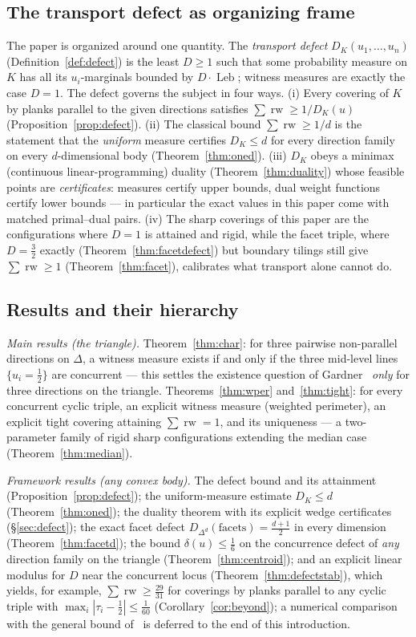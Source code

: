 \documentclass{aims}
\numberwithin{equation}{section}
\theoremstyle{plain}
\theoremstyle{definition}
\theoremstyle{remark}
\newcommand{\rw}{\operatorname{rw}}
\newcommand{\Leb}{\operatorname{Leb}}
\begin{document}
\subsection*{The transport defect as organizing frame}
The paper is organized around one quantity. The \emph{transport defect}
$D_K(u_1,\dots,u_n)$ (Definition~\ref{def:defect}) is the least $D\ge1$ such
that some probability measure on $K$ has all its $u_i$-marginals bounded by
$D\cdot\Leb$; witness measures are exactly the case $D=1$. The defect governs
the subject in four ways. (i) Every covering of $K$ by planks parallel to the
given directions satisfies $\sum\rw\ge1/D_K(u)$
(Proposition~\ref{prop:defect}). (ii) The classical bound $\sum\rw\ge1/d$ is
the statement that the \emph{uniform} measure certifies $D_K\le d$ for every
direction family on every $d$-dimensional body (Theorem~\ref{thm:oned}).
(iii) $D_K$ obeys a minimax (continuous linear-programming) duality
(Theorem~\ref{thm:duality}) whose feasible points are \emph{certificates}:
measures certify upper bounds, dual weight functions certify lower bounds ---
in particular the exact values in this paper come with matched primal--dual
pairs. (iv) The sharp coverings of this paper are the configurations where
$D=1$ is attained and rigid, while the facet triple, where
$D=\tfrac32$ exactly (Theorem~\ref{thm:facetdefect}) but boundary tilings
still give $\sum\rw\ge1$ (Theorem~\ref{thm:facet}), calibrates what transport
alone cannot do.

\subsection*{Results and their hierarchy}
\emph{Main results (the triangle).} Theorem~\ref{thm:char}: for three pairwise
non-parallel directions on $\Delta$, a witness measure exists if and only if
the three mid-level lines $\{u_i=\tfrac12\}$ are concurrent --- this settles
the existence question of Gardner~\cite{Gardner88} \emph{only} for three
directions on the triangle. Theorems~\ref{thm:wper} and~\ref{thm:tight}: for
every concurrent cyclic triple, an explicit witness measure (weighted
perimeter), an explicit tight covering attaining $\sum\rw=1$, and its
uniqueness --- a two-parameter family of rigid sharp configurations extending
the median case (Theorem~\ref{thm:median}).

\emph{Framework results (any convex body).} The defect bound and its
attainment (Proposition~\ref{prop:defect}); the uniform-measure estimate
$D_K\le d$ (Theorem~\ref{thm:oned}); the duality theorem with its explicit
wedge certificates (\S\ref{sec:defect}); the exact facet defect
$D_{\Delta^d}(\text{facets})=\tfrac{d+1}2$ in every dimension
(Theorem~\ref{thm:facetd}); the bound $\delta(u)\le\tfrac16$ on the concurrence
defect of \emph{any} direction family on the triangle
(Theorem~\ref{thm:centroid}); and an explicit linear modulus for $D$ near the
concurrent locus (Theorem~\ref{thm:defectstab}), which yields, for example,
$\sum\rw\ge\tfrac{29}{31}$ for coverings by planks parallel to any
cyclic triple with $\max_i|\tau_i-\tfrac12|\le\tfrac1{60}$
(Corollary~\ref{cor:beyond}); a numerical comparison with the general bound
of~\cite{BY26} is deferred to the end of this introduction.
\end{document}
